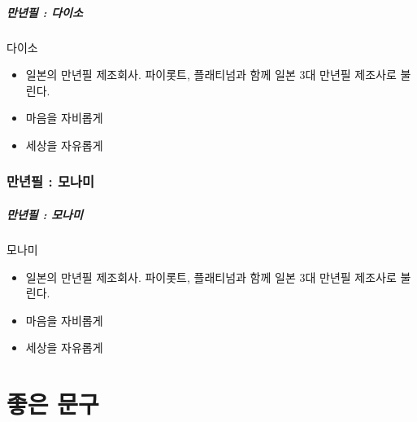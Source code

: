\documentclass[aspectratio=1610,20pt,xcolor=pdftex,dvipsnames,table,handout]{beamer}
\begin{document}
		\begin{frame} [t,plain]
		\frametitle{만년필 : 다이소 }

			\begin{block} {다이소}
			\setlength{\leftmargini}{2em}			
			\begin{itemize}
				\item 일본의 만년필 제조회사. 파이롯트, 플래티넘과 함께 일본 3대 만년필 제조사로 불린다.
				\item 마음을 자비롭게
				\item 세상을 자유롭게
			\end{itemize}
			\end{block}						

		\end{frame}						

		\section{만년필 : 모나미 }

		\begin{frame} [t,plain]
		\frametitle{만년필 : 모나미 }

			\begin{block} {모나미}
			\setlength{\leftmargini}{2em}			
			\begin{itemize}
				\item 일본의 만년필 제조회사. 파이롯트, 플래티넘과 함께 일본 3대 만년필 제조사로 불린다.
				\item 마음을 자비롭게
				\item 세상을 자유롭게
			\end{itemize}
			\end{block}						

		\end{frame}						

		\begin{frame} [t,plain]
		\end{frame}						




		\part{좋은 문구}
		\frame{\partpage}
		
\end{document}

